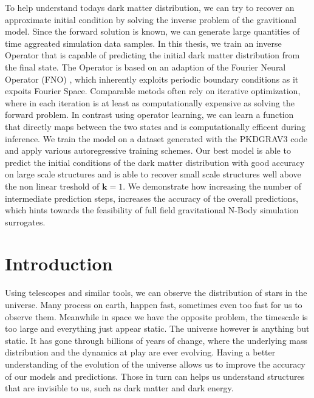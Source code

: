 \documentclass{article}
\begin{document}
To help understand todays dark matter distribution, we can try to recover an approximate initial condition by solving the inverse problem of the gravitional model. Since the forward solution is known, we can generate large quantities of time aggreated simulation data samples. In this thesis, we train an inverse Operator that is capable of predicting the initial dark matter distribution from the final state. The Operator is based on an adaption of the Fourier Neural Operator (FNO) \citep{li2020fourier}, which inherently exploits periodic boundary conditions as it expoits Fourier Space. Comparable metods often rely on iterative optimization, where in each iteration is at least as computationally expensive as solving the forward problem. In contrast using operator learning, we can learn a function that directly maps between the two states and is  computationally efficent during inference. We train the model on a dataset generated with the PKDGRAV3 code \citep{potter2017pkdgrav3} and apply various autoregressive training schemes. Our best model is able to predict the initial conditions of the dark matter distribution with good accuracy on large scale structures and is able to recover small scale structures well above the non linear treshold of $\mathbf{k} = 1$. We demonstrate how increasing the number of intermediate prediction steps, increases the accuracy of the overall predictions, which hints towards the feasibility of full field gravitational N-Body simulation surrogates. 
\newpage 

\tableofcontents

\newpage


\section{Introduction}


Using telescopes and similar tools, we can observe the distribution of stars in the universe. Many process on earth, happen fast, sometimes even too fast for us to observe them. Meanwhile in space we have the opposite problem, the timescale is too large and everything just appear static. The universe however is anything but static. It has gone through billions of years of change, where the underlying mass distribution and the dynamics at play are ever evolving. Having a better understanding of the evolution of the universe allows us to improve the accuracy of our models and predictions. Those in turn can helps us understand structures that are invisible to us, such as dark matter and dark energy.
\end{document}
